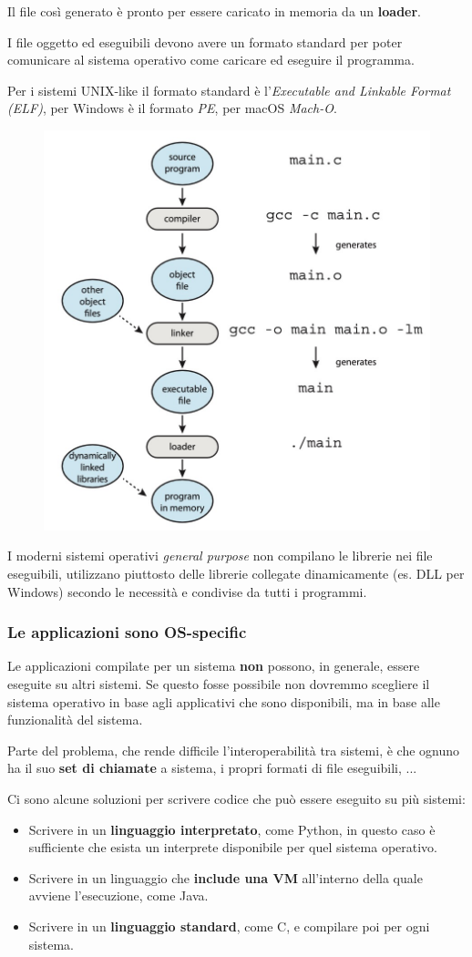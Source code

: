 Il file così generato è pronto per essere caricato in memoria da un \textbf{loader}.

\spacer

I file oggetto ed eseguibili devono avere un formato standard per poter comunicare al sistema operativo come caricare ed eseguire il programma.

Per i sistemi UNIX-like il formato standard è l'\textit{Executable and Linkable Format (ELF)}, per Windows è il formato \textit{PE}, per macOS \textit{Mach-O}.
\begin{figure}[H]
    \centering
    \includegraphics[width=0.38\linewidth]{assets/linker-loader.jpg}
\end{figure}

\begin{note}
    I moderni sistemi operativi \textit{general purpose} non compilano le librerie nei file eseguibili, utilizzano piuttosto delle librerie collegate dinamicamente (es. DLL per Windows) secondo le necessità e condivise da tutti i programmi.
\end{note}

\subsubsection{Le applicazioni sono OS-specific}
Le applicazioni compilate per un sistema \textbf{non} possono, in generale, essere eseguite su altri sistemi. Se questo fosse possibile non dovremmo scegliere il sistema operativo in base agli applicativi che sono disponibili, ma in base alle funzionalità del sistema.

\spacer
Parte del problema, che rende difficile l'interoperabilità tra sistemi, è che ognuno ha il suo \textbf{set di chiamate} a sistema, i propri formati di file eseguibili, ...

\spacer
Ci sono alcune soluzioni per scrivere codice che può essere eseguito su più sistemi:
\begin{itemize}
    \item Scrivere in un \textbf{linguaggio interpretato}, come Python, in questo caso è sufficiente che esista un interprete disponibile per quel sistema operativo.

    \item Scrivere in un linguaggio che \textbf{include una VM} all'interno della quale avviene l'esecuzione, come Java.

    \item Scrivere in un \textbf{linguaggio standard}, come C, e compilare poi per ogni sistema.
\end{itemize}

